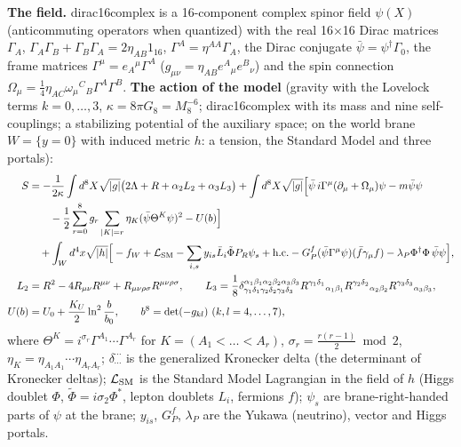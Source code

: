 \documentclass[10pt,a4paper]{article}
\begin{document}
\textbf{The field.} dirac16complex is a 16-component complex spinor field $\psi(X)$ (anticommuting operators when quantized) with the real 16×16 Dirac matrices $\Gamma_A$, $\Gamma_A\Gamma_B+\Gamma_B\Gamma_A=2\eta_{AB}1_{16}$, $\Gamma^A=\eta^{AA}\Gamma_A$, the Dirac conjugate $\bar\psi=\psi^\dagger\Gamma_0$, the frame matrices $\Gamma^\mu=e_A{}^\mu\Gamma^A$ ($g_{\mu\nu}=\eta_{AB}e^A{}_\mu e^B{}_\nu$) and the spin connection $\Omega_\mu=\frac14\eta_{AC}\omega_\mu{}^C{}_B\Gamma^A\Gamma^B$. \textbf{The action of the model} (gravity with the Lovelock terms $k=0,\dots,3$, $\kappa=8\pi G_8=M_8^{-6}$; dirac16complex with its mass and nine self-couplings; a stabilizing potential of the auxiliary space; on the world brane $W=\lbrace y=0\rbrace$ with induced metric $h$: a tension, the Standard Model and three portals):
\begin{align*}
S&=-\frac1{2\kappa}\int d^8X\sqrt{|g|}\big(2\Lambda+R+\alpha_2L_2+\alpha_3L_3\big)+\int d^8X\sqrt{|g|}\Big[\bar\psi\,i\Gamma^\mu(\partial_\mu+\Omega_\mu)\psi-m\bar\psi\psi \\
&\qquad-\frac12\sum_{r=0}^8g_r\sum_{|K|=r}\eta_K(\bar\psi\Theta^K\psi)^2-U(b)\Big] \\
&\quad+\int_Wd^4x\sqrt{|h|}\Big[-f_W+\mathcal L_{\rm SM}-\sum_{i,s}y_{is}\bar L_i\tilde\Phi P_R\psi_s+\text{h.c.}-G_P^f(\bar\psi\Gamma^\mu\psi)(\bar f\gamma_\mu f)-\lambda_P\Phi^\dagger\Phi\,\bar\psi\psi\Big], \\
L_2&=R^2-4R_{\mu\nu}R^{\mu\nu}+R_{\mu\nu\rho\sigma}R^{\mu\nu\rho\sigma},\qquad L_3=\frac18\delta^{\alpha_1\beta_1\alpha_2\beta_2\alpha_3\beta_3}_{\gamma_1\delta_1\gamma_2\delta_2\gamma_3\delta_3}R^{\gamma_1\delta_1}{}_{\alpha_1\beta_1}R^{\gamma_2\delta_2}{}_{\alpha_2\beta_2}R^{\gamma_3\delta_3}{}_{\alpha_3\beta_3}, \\
U(b)&=U_0+\frac{K_U}2\ln^2\frac b{b_0},\qquad b^8=\det(-g_{kl})\ (k,l=4,\dots,7),
\end{align*}
where $\Theta^K=i^{\sigma_r}\Gamma^{A_1}\cdots\Gamma^{A_r}$ for $K=(A_1<\dots<A_r)$, $\sigma_r=\frac{r(r-1)}2\bmod2$, $\eta_K=\eta_{A_1A_1}\cdots\eta_{A_rA_r}$; $\delta^{\cdots}_{\cdots}$ is the generalized Kronecker delta (the determinant of Kronecker deltas); $\mathcal L_{\rm SM}$ is the Standard Model Lagrangian in the field of $h$ (Higgs doublet $\Phi$, $\tilde\Phi=i\sigma_2\Phi^*$, lepton doublets $L_i$, fermions $f$); $\psi_s$ are brane-right-handed parts of $\psi$ at the brane; $y_{is}$, $G_P^f$, $\lambda_P$ are the Yukawa (neutrino), vector and Higgs portals.
\end{document}
